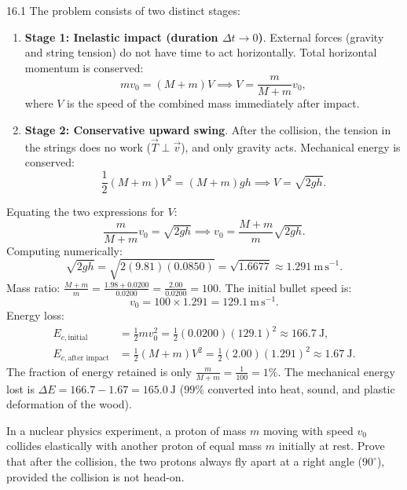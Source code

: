 \begin{solution}{16.1}
The problem consists of two distinct stages:
\begin{enumerate}[leftmargin=1.5em,itemsep=2pt]
  \item \textbf{Stage 1: Inelastic impact (duration $\Delta t \to 0$)}.
  External forces (gravity and string tension) do not have time to act horizontally. Total horizontal momentum is conserved:
  \[
  m v_0 = (M + m) V \implies V = \frac{m}{M + m}v_0,
  \]
  where $V$ is the speed of the combined mass immediately after impact.
  \item \textbf{Stage 2: Conservative upward swing}.
  After the collision, the tension in the strings does no work ($\vec{T}\perp\vec{v}$), and only gravity acts. Mechanical energy is conserved:
  \[
  \frac{1}{2}(M + m)V^2 = (M + m)gh \implies V = \sqrt{2gh}.
  \]
\end{enumerate}
Equating the two expressions for $V$:
\[
\frac{m}{M + m}v_0 = \sqrt{2gh} \implies \boxed{v_0 = \frac{M + m}{m}\sqrt{2gh}.}
\]
Computing numerically:
\[
\sqrt{2gh} = \sqrt{2(9.81)(0.0850)} = \sqrt{1.6677} \approx 1.291\ \mathrm{m\,s^{-1}}.
\]
Mass ratio: $\frac{M + m}{m} = \frac{1.98 + 0.0200}{0.0200} = \frac{2.00}{0.0200} = 100$.
The initial bullet speed is:
\[
v_0 = 100\times 1.291 = \mathbf{129.1\ \mathrm{m\,s^{-1}}.}
\]
Energy loss:
\begin{align*}
E_{c,\text{initial}} &= \frac{1}{2}m v_0^2 = \frac{1}{2}(0.0200)(129.1)^2 \approx 166.7\ \mathrm{J}, \\
E_{c,\text{after impact}} &= \frac{1}{2}(M + m)V^2 = \frac{1}{2}(2.00)(1.291)^2 \approx 1.67\ \mathrm{J}.
\end{align*}
The fraction of energy retained is only $\frac{m}{M+m} = \frac{1}{100} = 1\%$.
The mechanical energy lost is $\Delta E = 166.7 - 1.67 = \mathbf{165.0\ \mathrm{J}}$ ($99\%$ converted into heat, sound, and plastic deformation of the wood).
\end{solution}

\begin{worked}
In a nuclear physics experiment, a proton of mass $m$ moving with speed $v_0$ collides elastically with another proton of equal mass $m$ initially at rest.
Prove that after the collision, the two protons always fly apart at a right angle ($90^\circ$), provided the collision is not head-on.
\end{worked}

